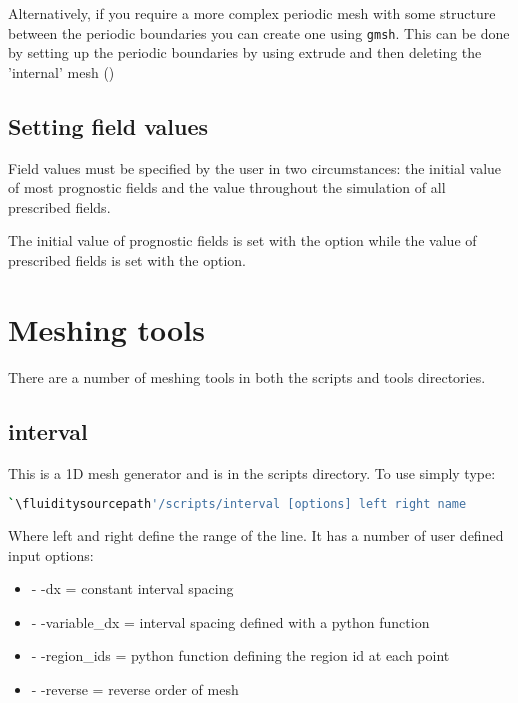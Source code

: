 Alternatively, if you require a more complex periodic mesh with some structure between the periodic 
boundaries you can create one using \lstinline[language=Bash]{gmsh}. This can be done by 
setting up the periodic boundaries by using extrude and then deleting the 'internal' mesh (\website)

\subsection{Setting field values}\label{Sect:setting_field_values}
Field values must be specified by the user in two circumstances: the initial
value of most prognostic fields and the value throughout the simulation of
all prescribed fields. 

The initial value of prognostic fields is set with the
 option while the value of
prescribed fields is set with the  option.

\section{Meshing tools}

There are a number of meshing tools in both the scripts and tools directories.

\subsection{interval}
This is a 1D mesh generator and is in the scripts directory. To use simply type:


\begin{lstlisting}[language = Bash]
`\fluiditysourcepath'/scripts/interval [options] left right name 
\end{lstlisting}

Where left and right define the range of the line. It has a number of user defined input options:

\begin{itemize}
\item - -dx = constant interval spacing
\item - -variable\_dx = interval spacing defined with a python function
\item - -region\_ids = python function defining the region id at each point
\item - -reverse = reverse order of mesh
\end{itemize}

